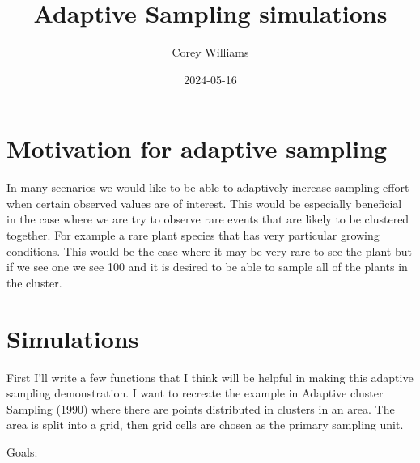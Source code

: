 \documentclass[
]{article}
\title{Adaptive Sampling simulations}
\author{Corey Williams}
\date{2024-05-16}
\begin{document}
\maketitle

{
\setcounter{tocdepth}{2}
\tableofcontents
}
\section{Motivation for adaptive
sampling}\label{motivation-for-adaptive-sampling}

In many scenarios we would like to be able to adaptively increase
sampling effort when certain observed values are of interest. This would
be especially beneficial in the case where we are try to observe rare
events that are likely to be clustered together. For example a rare
plant species that has very particular growing conditions. This would be
the case where it may be very rare to see the plant but if we see one we
see 100 and it is desired to be able to sample all of the plants in the
cluster.

\section{Simulations}\label{simulations}

First I'll write a few functions that I think will be helpful in making
this adaptive sampling demonstration. I want to recreate the example in
Adaptive cluster Sampling (1990) where there are points distributed in
clusters in an area. The area is split into a grid, then grid cells are
chosen as the primary sampling unit.

Goals:
\end{document}
